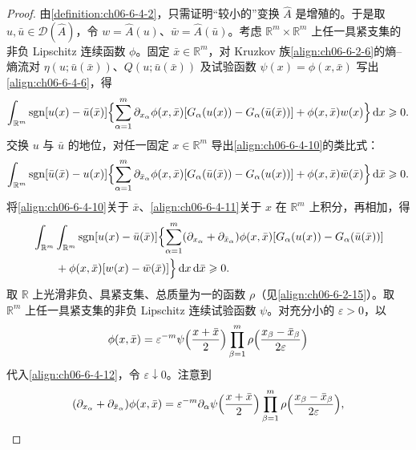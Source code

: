 \documentclass[../../main.tex]{subfiles}
\begin{document}
\begin{proof}
由\cref{definition:ch06-6-4-2}，只需证明“较小的”变换 $\hat{A}$ 是增殖的。于是取 $u,\bar{u}\in\mathscr{D}(\hat{A})$，令 $w=\hat{A}(u)$、$\bar{w}=\hat{A}(\bar{u})$。考虑 $\mathbb{R}^{m}\times\mathbb{R}^{m}$ 上任一具紧支集的非负 Lipschitz 连续函数 $\phi$。固定 $\bar{x}\in\mathbb{R}^{m}$，对 Kruzkov 族\eqref{align:ch06-6-2-6}的熵--熵流对 $\eta(u;\bar{u}(\bar{x}))$、$Q(u;\bar{u}(\bar{x}))$ 及试验函数 $\psi(x)=\phi(x,\bar{x})$ 写出\eqref{align:ch06-6-4-6}，得
\begin{align}
\int_{\mathbb{R}^{m}}\operatorname{sgn}[u(x)-\bar{u}(\bar{x})]\Bigl{\{}\sum_{\alpha=1}^{m}\partial_{x_{\alpha}}\phi(x,\bar{x})[G_{\alpha}(u(x))-G_{\alpha}(\bar{u}(\bar{x}))]+\phi(x,\bar{x})w(x)\Bigr{\}}\,\mathrm{d}x\geqslant 0.
\label{align:ch06-6-4-10}
\end{align}
交换 $u$ 与 $\bar{u}$ 的地位，对任一固定 $x\in\mathbb{R}^{m}$ 导出\eqref{align:ch06-6-4-10}的类比式：
\begin{align}
\int_{\mathbb{R}^{m}}\operatorname{sgn}[\bar{u}(\bar{x})-u(x)]\Bigl{\{}\sum_{\alpha=1}^{m}\partial_{\bar{x}_{\alpha}}\phi(x,\bar{x})[G_{\alpha}(\bar{u}(\bar{x}))-G_{\alpha}(u(x))]+\phi(x,\bar{x})\bar{w}(\bar{x})\Bigr{\}}\,\mathrm{d}\bar{x}\geqslant 0.
\label{align:ch06-6-4-11}
\end{align}
将\eqref{align:ch06-6-4-10}关于 $\bar{x}$、\eqref{align:ch06-6-4-11}关于 $x$ 在 $\mathbb{R}^{m}$ 上积分，再相加，得
\begin{align}
&\int_{\mathbb{R}^{m}}\int_{\mathbb{R}^{m}}\operatorname{sgn}[u(x)-\bar{u}(\bar{x})]\Bigl{\{}\sum_{\alpha=1}^{m}(\partial_{x_{\alpha}}+\partial_{\bar{x}_{\alpha}})\phi(x,\bar{x})[G_{\alpha}(u(x))-G_{\alpha}(\bar{u}(\bar{x}))]\notag\\
&\qquad+\phi(x,\bar{x})[w(x)-\bar{w}(\bar{x})]\Bigr{\}}\,\mathrm{d}x\,\mathrm{d}\bar{x}\geqslant 0.
\label{align:ch06-6-4-12}
\end{align}
取 $\mathbb{R}$ 上光滑非负、具紧支集、总质量为一的函数 $\rho$（见\eqref{align:ch06-6-2-15}）。取 $\mathbb{R}^{m}$ 上任一具紧支集的非负 Lipschitz 连续试验函数 $\psi$。对充分小的 $\varepsilon>0$，以
\begin{align}
\phi(x,\bar{x})=\varepsilon^{-m}\psi\Bigl{(}\frac{x+\bar{x}}{2}\Bigr{)}\prod_{\beta=1}^{m}\rho\Bigl{(}\frac{x_{\beta}-\bar{x}_{\beta}}{2\varepsilon}\Bigr{)}
\label{align:ch06-6-4-13}
\end{align}
代入\eqref{align:ch06-6-4-12}，令 $\varepsilon\downarrow 0$。注意到
\begin{align}
(\partial_{x_{\alpha}}+\partial_{\bar{x}_{\alpha}})\phi(x,\bar{x})=\varepsilon^{-m}\partial_{\alpha}\psi\Bigl{(}\frac{x+\bar{x}}{2}\Bigr{)}\prod_{\beta=1}^{m}\rho\Bigl{(}\frac{x_{\beta}-\bar{x}_{\beta}}{2\varepsilon}\Bigr{)},

\end{align}
\end{proof}
\end{document}
